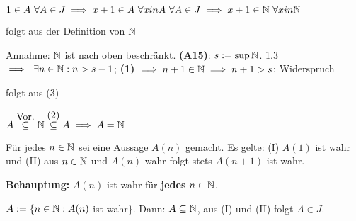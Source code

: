 \documentclass[a4paper,twoside,DIV15,BCOR12mm]{scrbook}
\begin{document}
\begin{beweis}
\begin{liste}
\item $1 \in A \ \forall A \in J \implies x + 1 \in A \ \forall x in A\ \forall A \in J \implies x+1 \in \mathbb{N}\ \forall x in \mathbb{N}$
\item folgt aus der Definition von $\mathbb{N}$
\item Annahme: $\mathbb{N}$ ist nach oben beschränkt. \textbf{(A15)}: $s := \sup{\ensuremath{\mathbb{N}}}$. 1.3 $\implies \ \exists n \in\mathbb{N}: n > s - 1$; \textbf{(1)} $\implies n+1 \in \mathbb{N} \implies n+1 > s$; Widerspruch
\item folgt aus (3)
\item $A \stackrel{\mbox{Vor.}}{\subseteq} \mathbb{N} \stackrel{\mbox{(2)}}{\subseteq} A \implies A = \mathbb{N}$
\end{liste}
\end{beweis}

\begin{satz}

Für jedes $n \in \mathbb{N}$ sei eine Aussage $A(n)$ gemacht. Es gelte: (I) $A(1)$ ist wahr und (II) aus $n \in \mathbb{N}$ und $A(n)$ wahr folgt stets $A(n+1)$ ist wahr.

\textbf{Behauptung:} $A(n)$ ist wahr für \textbf{jedes} $n \in \mathbb{N}$.
\end{satz}

\begin{beweis} $A := \{ n \in \mathbb{N}: A(n)$ ist wahr$\}$. Dann: $A \subseteq \mathbb{N}$, aus (I) und (II) folgt $A \in J$.
\end{beweis}
\end{document}
